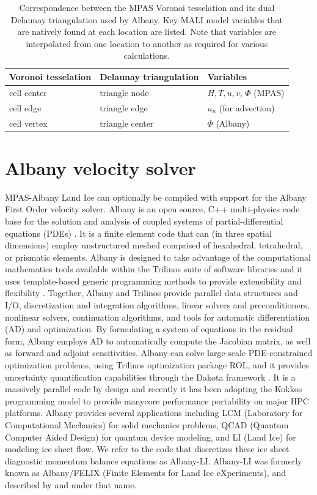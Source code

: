 \begin{table}[h]
\caption{Correspondence between the MPAS Voronoi tesselation and its dual Delaunay triangulation used by Albany.
Key MALI model variables that are natively found at each location are listed.  Note that variables are interpolated from 
one location to another as required for various calculations.
}
\begin{tabular}{lll}
\hline
Voronoi tesselation & Delaunay triangulation & Variables\\
\hline
cell center & triangle node   & $H, T, u, v$, $\Phi$ (MPAS) \\
cell edge   & triangle edge   & $u_n$ (for advection) \\
cell vertex & triangle center & $\Phi$ (Albany)\\
\hline
\end{tabular}
\label{table:meshes}
\end{table}




\section{Albany velocity solver}
MPAS-Albany Land Ice can optionally be compiled with support for the Albany First Order velocity solver.
Albany is an open source, C++ multi-physics code base for the solution and analysis of coupled systems of partial-differential equations (PDEs) \citep{Salinger2016}. 
It is a finite element code that can (in three spatial dimensions) employ unstructured meshed comprised of hexahedral, tetrahedral, or prismatic elements. 
Albany is designed to take advantage of the computational mathematics tools available within the Trilinos suite of software libraries \citep{Trilinos} 
and it uses template-based generic programming methods to provide extensibility and flexibility \citep{Pawlowski2012}. 
Together, Albany and Trilinos provide parallel data structures and I/O, discretization and integration algorithms, 
linear solvers and preconditioners, nonlinear solvers, continuation algorithms, and tools for automatic differentiation (AD) and optimization. 
By formulating a system of equations in the residual form, Albany employs AD to automatically compute the Jacobian matrix, 
as well as forward and adjoint sensitivities. 
Albany can solve large-scale PDE-constrained optimization problems, using Trilinos optimization package ROL, 
and it provides uncertainty quantification capabilities through the Dakota framework \citep{Adams2013}. 
It is a massively parallel code by design and recently it has been adopting the Kokkos \citep{kokkos2014} programming model 
to provide manycore performance portability \citep{demeshko2018} on major HPC platforms. 
Albany provides several applications including LCM (Laboratory for Computational Mechanics) for solid mechanics problems, 
QCAD (Quantum Computer Aided Design) for quantum device modeling, and LI (Land Ice) for modeling ice sheet flow. 
We refer to the code that discretizes these ice sheet diagnostic momentum balance equations as Albany-LI.
Albany-LI was formerly known as Albany/FELIX (Finite Elements for Land Ice eXperiments), and described by 
\cite{tezaur2015a,tezaur2015b} and \cite{Tuminaro2016} under that name.

